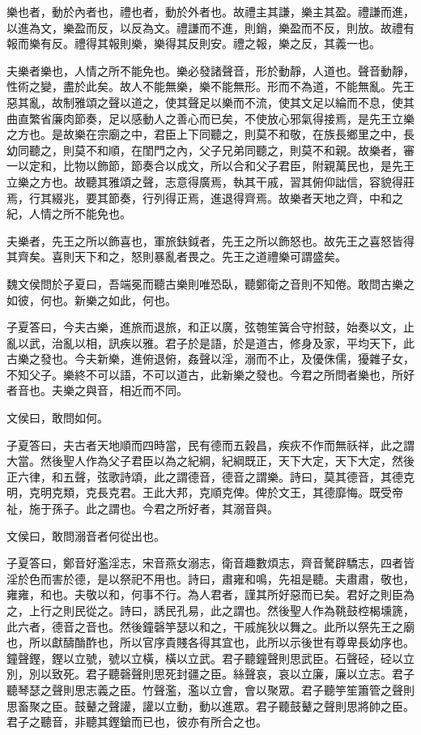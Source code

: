樂也者，動於內者也，禮也者，動於外者也。故禮主其謙，樂主其盈。禮謙而進，以進為文，樂盈而反，以反為文。禮謙而不進，則銷，樂盈而不反，則放。故禮有報而樂有反。禮得其報則樂，樂得其反則安。禮之報，樂之反，其義一也。

夫樂者樂也，人情之所不能免也。樂必發諸聲音，形於動靜，人道也。聲音動靜，性術之變，盡於此矣。故人不能無樂，樂不能無形。形而不為道，不能無亂。先王惡其亂，故制雅頌之聲以道之，使其聲足以樂而不流，使其文足以綸而不息，使其曲直繁省廉肉節奏，足以感動人之善心而已矣，不使放心邪氣得接焉，是先王立樂之方也。是故樂在宗廟之中，君臣上下同聽之，則莫不和敬，在族長鄉里之中，長幼同聽之，則莫不和順，在閨門之內，父子兄弟同聽之，則莫不和親。故樂者，審一以定和，比物以飾節，節奏合以成文，所以合和父子君臣，附親萬民也，是先王立樂之方也。故聽其雅頌之聲，志意得廣焉，執其干戚，習其俯仰詘信，容貌得莊焉，行其綴兆，要其節奏，行列得正焉，進退得齊焉。故樂者天地之齊，中和之紀，人情之所不能免也。

夫樂者，先王之所以飾喜也，軍旅鈇鉞者，先王之所以飾怒也。故先王之喜怒皆得其齊矣。喜則天下和之，怒則暴亂者畏之。先王之道禮樂可謂盛矣。

魏文侯問於子夏曰，吾端冕而聽古樂則唯恐臥，聽鄭衛之音則不知倦。敢問古樂之如彼，何也。新樂之如此，何也。

子夏答曰，今夫古樂，進旅而退旅，和正以廣，弦匏笙簧合守拊鼓，始奏以文，止亂以武，治亂以相，訊疾以雅。君子於是語，於是道古，修身及家，平均天下，此古樂之發也。今夫新樂，進俯退俯，姦聲以淫，溺而不止，及優侏儒，獶雜子女，不知父子。樂終不可以語，不可以道古，此新樂之發也。今君之所問者樂也，所好者音也。夫樂之與音，相近而不同。

文侯曰，敢問如何。

子夏答曰，夫古者天地順而四時當，民有德而五穀昌，疾疢不作而無祅祥，此之謂大當。然後聖人作為父子君臣以為之紀綱，紀綱既正，天下大定，天下大定，然後正六律，和五聲，弦歌詩頌，此之謂德音，德音之謂樂。詩曰，莫其德音，其德克明，克明克類，克長克君。王此大邦，克順克俾。俾於文王，其德靡悔。既受帝祉，施于孫子。此之謂也。今君之所好者，其溺音與。

文侯曰，敢問溺音者何從出也。

子夏答曰，鄭音好濫淫志，宋音燕女溺志，衛音趣數煩志，齊音驁辟驕志，四者皆淫於色而害於德，是以祭祀不用也。詩曰，肅雍和鳴，先祖是聽。夫肅肅，敬也，雍雍，和也。夫敬以和，何事不行。為人君者，謹其所好惡而已矣。君好之則臣為之，上行之則民從之。詩曰，誘民孔易，此之謂也。然後聖人作為鞉鼓椌楬壎篪，此六者，德音之音也。然後鐘磬竽瑟以和之，干戚旄狄以舞之。此所以祭先王之廟也，所以獻醻酳酢也，所以官序貴賤各得其宜也，此所以示後世有尊卑長幼序也。鐘聲鏗，鏗以立號，號以立橫，橫以立武。君子聽鐘聲則思武臣。石聲硁，硁以立別，別以致死。君子聽磬聲則思死封疆之臣。絲聲哀，哀以立廉，廉以立志。君子聽琴瑟之聲則思志義之臣。竹聲濫，濫以立會，會以聚眾。君子聽竽笙簫管之聲則思畜聚之臣。鼓鼙之聲讙，讙以立動，動以進眾。君子聽鼓鼙之聲則思將帥之臣。君子之聽音，非聽其鏗鎗而已也，彼亦有所合之也。

